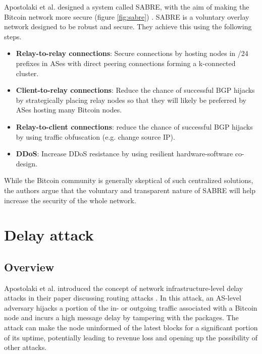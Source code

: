 \documentclass[12pt]{article}
\begin{document}
Apostolaki et al. designed a system called SABRE, with the aim of making the Bitcoin network more secure (figure \ref{fig:sabre}) \cite{SABRE}. SABRE is a voluntary overlay network designed to be robust and secure. They achieve this using the following steps.

\begin{itemize}
    \item \textbf{Relay-to-relay connections}: Secure connections by hosting nodes in /24 prefixes in ASes with direct peering connections forming a k-connected cluster.

    \item \textbf{Client-to-relay connections}: Reduce the chance of successful BGP hijacks by strategically placing relay nodes so that they will likely be preferred by ASes hosting many Bitcoin nodes.
    
    \item \textbf{Relay-to-client connections}: reduce the chance of successful BGP hijacks by using traffic obfuscation (e.g. change source IP).
    
    \item \textbf{DDoS}: Increase DDoS resistance by using resilient hardware-software co-design.
\end{itemize}

While the Bitcoin community is generally skeptical of such centralized solutions, the authors argue that the voluntary and transparent nature of SABRE will help increase the security of the whole network.

\section{Delay attack}
\label{sec:delay}

\subsection{Overview}

Apostolaki et al. introduced the concept of network infrastructure-level delay attacks in their paper discussing routing attacks \cite{RoutingAttacks}. In this attack, an AS-level adversary hijacks a portion of the in- or outgoing traffic associated with a Bitcoin node and incurs a high message delay by tampering with the packages. The attack can make the node uninformed of the latest blocks for a significant portion of its uptime, potentially leading to revenue loss and opening up the possibility of other attacks.
\end{document}
